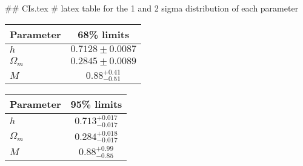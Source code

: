## CIs.tex
# latex table for the 1 and 2 sigma distribution of each parameter

\begin{tabular} { l  c}
 Parameter &  68\% limits\\
\hline
{\boldmath$h              $} & $0.7128\pm 0.0087          $\\
{\boldmath$\Omega_m       $} & $0.2845\pm 0.0089          $\\
{\boldmath$M              $} & $0.88^{+0.41}_{-0.51}      $\\
\hline
\end{tabular}

\begin{tabular} { l  c}
 Parameter &  95\% limits\\
\hline
{\boldmath$h              $} & $0.713^{+0.017}_{-0.017}   $\\
{\boldmath$\Omega_m       $} & $0.284^{+0.018}_{-0.017}   $\\
{\boldmath$M              $} & $0.88^{+0.99}_{-0.85}      $\\
\hline
\end{tabular}
